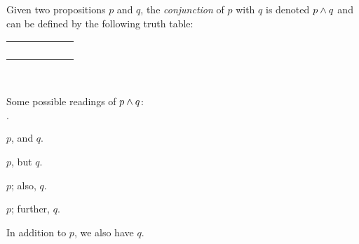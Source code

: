 \begin{definition}[Conjunction]
    \begin{center}
        \begin{minipage}[t]{.55\linewidth}
            Given two propositions \(p\) and \(q\), the \emph{conjunction} of \(p\) with \(q\)
            is denoted \(p \wedge q\) and can be defined by the following truth table:
            \begin{table}[H]
                \centering
                \label{tab:and}
                \begin{tabular}{|CcCc||Cc|} \hline
                     &  &  \\ \hline
                    \thead{\(\top\)} & \thead{\(\top\)} &  \\
                    \thead{\(\top\)} & \thead{\(\bot\)} &  \\
                    \thead{\(\bot\)} & \thead{\(\top\)} &  \\
                    \thead{\(\bot\)} & \thead{\(\bot\)} &  \\ \hline
                \end{tabular}
            \end{table}
        \end{minipage}%
        \begin{minipage}[t]{.05\linewidth}
            ~
        \end{minipage}%
        \begin{minipage}[t]{.4\linewidth}
            Some possible readings of \(p \wedge q\):\\
            \begin{list}{\(\cdot\)}{}
                \item
                    \(p\), and \(q\).
                \item
                    \(p\), but \(q\).
                \item
                    \(p\); also, \(q\).
                \item
                    \(p\); further, \(q\).
                \item
                    In addition to \(p\), we also have \(q\).
            \end{list}
        \end{minipage}
    \end{center}
\end{definition}


